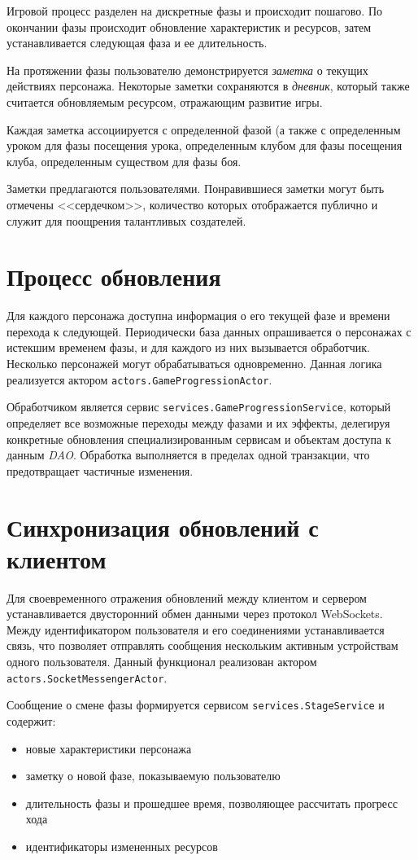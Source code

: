 \documentclass[12pt, a4paper]{article}
\begin{document}
Игровой процесс разделен на дискретные фазы и происходит пошагово. По окончании фазы
происходит обновление характеристик и ресурсов, затем устанавливается следующая фаза
и ее длительность.

На протяжении фазы пользователю демонстрируется \textit{заметка} о текущих действиях
персонажа. Некоторые заметки сохраняются в \textit{дневник}, который также считается
обновляемым ресурсом, отражающим развитие игры.

Каждая заметка ассоциируется с определенной фазой (а также с определенным уроком
для фазы посещения урока, определенным клубом для фазы посещения клуба,
определенным существом для фазы боя.

Заметки предлагаются пользователями. Понравившиеся заметки могут быть отмечены
<<сердечком>>, количество которых отображается публично и служит для поощрения
талантливых создателей.

\section*{Процесс обновления}

Для каждого персонажа доступна информация о его текущей фазе и времени перехода к
следующей. Периодически база данных опрашивается о персонажах с истекшим
временем фазы, и для каждого из них вызывается обработчик. Несколько персонажей
могут обрабатываться одновременно. Данная логика реализуется актором
\texttt{actors.GameProgressionActor}.

Обработчиком является сервис \texttt{services.GameProgressionService},
который определяет все возможные переходы между фазами и их эффекты, делегируя
конкретные обновления специализированным сервисам и объектам доступа к данным \textit{DAO}.
Обработка выполняется в пределах одной транзакции, что предотвращает
частичные изменения.

\section*{Синхронизация обновлений с клиентом}

Для своевременного отражения обновлений между клиентом и сервером устанавливается
двусторонний обмен данными через протокол WebSockets. Между идентификатором пользователя
и его соединениями устанавливается связь, что позволяет отправлять сообщения нескольким активным
устройствам одного пользователя. Данный функционал реализован актором \texttt{actors.SocketMessengerActor}.

Сообщение о смене фазы формируется сервисом \texttt{services.StageService} и содержит:
\begin{itemize}
\item новые характеристики персонажа
\item заметку о новой фазе, показываемую пользователю
\item длительность фазы и прошедшее время, позволяющее рассчитать прогресс хода
\item идентификаторы измененных ресурсов
\end{itemize}
\end{document}
